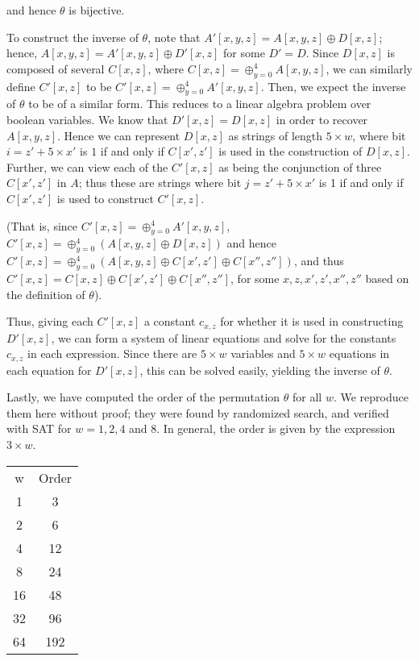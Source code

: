 \documentclass[10pt,twocolumn,twoside]{pnas-new}
\begin{document}
and hence $\theta$ is bijective.


To construct the inverse of $\theta$, note that
$A'[x, y, z] = A[x, y, z] \oplus D[x, z]$; hence,
$A[x, y, z] = A'[x, y, z] \oplus D'[x, z]$ for some $D' = D$. Since $D[x, z]$
is composed of several $C[x, z]$, where
$C[x, z] = \oplus_{y = 0}^{4} A[x, y, z]$, we can similarly define $C'[x, z]$
to be $C'[x, z] = \oplus_{y = 0}^{4} A'[x, y, z]$. Then, we expect the inverse
of $\theta$ to be of a similar form. This reduces to a linear algebra problem
over boolean variables. We know that $D'[x, z] = D[x, z]$ in order to recover
$A[x, y, z]$. Hence we can represent $D[x, z]$ as strings of length
$5 \times w$, where bit $i = z' + 5 \times x'$ is $1$ if and only if
$C[x', z']$ is used in the construction of $D[x, z]$. Further, we can view each
of the $C'[x, z]$ as being the conjunction of three $C[x', z']$ in $A$; thus
these are strings where bit $j = z' + 5\times x'$ is 1 if and only if
$C[x', z']$ is used to construct $C'[x, z]$.

(That is, since $C'[x, z] = \oplus_{y = 0}^{4} A'[x, y, z]$,
$C'[x, z] = \oplus_{y = 0}^{4} (A[x, y, z] \oplus D[x, z])$ and hence
$C'[x, z] = \oplus_{y = 0}^{4} (A[x, y, z] \oplus C[x', z'] \oplus C[x'', z''])$,
and thus $C'[x, z] = C[x, z] \oplus C[x', z'] \oplus C[x'', z'']$, for some
$x, z, x', z', x'', z''$ based on the definition of $\theta$).

Thus, giving each $C'[x, z]$ a constant $c_{x,z}$ for whether it is used in
constructing $D'[x, z]$, we can form a system of linear equations and solve for
the constants $c_{x, z}$ in each expression. Since there are $5 \times w$
variables and $5 \times w$ equations in each equation for $D'[x, z]$, this can
be solved easily, yielding the inverse of $\theta$.


Lastly, we have computed the order of the permutation $\theta$ for all $w$.
We reproduce them here without proof; they were found by randomized search, and
verified with SAT for $w = 1, 2, 4$ and $8$. In general, the order is given by
the expression $3 \times w$.

\begin{tabular}{c c} \label{tab:p:t:1}
    w & Order \\
    1 & 3 \\
    2 & 6 \\
    4 & 12 \\
    8 & 24 \\
    16 & 48 \\
    32 & 96 \\
    64 & 192 \\
\end{tabular}
\end{document}
